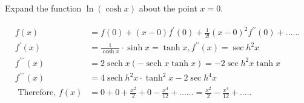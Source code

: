\begin{exercise}
	Expand the function $\ln (\cosh x)$ about the point $x=0$.
\end{exercise}
\begin{answer}
	\begin{align*}
	\begin{aligned}
	f(x)&=f(0)+(x-0) f^{\prime}(0)+\frac{1}{2 !}(x-0)^{2} f^{\prime \prime}(0)+\ldots \ldots \\
	f^{\prime}(x)&=\frac{1}{\cosh x} \cdot \sinh x=\tanh x, f^{\prime \prime}(x)=\sec h^{2} x \\
	f^{\prime \prime \prime}(x)&=2 \operatorname{sech} x(-\operatorname{sech} x \tanh x)=-2 \sec h^{2} x \tanh x \\
	f^{\prime \prime \prime}(x)&=4 \operatorname{sech} h^{2} x \cdot \tanh ^{2} x-2 \sec h^{4} x\\
	\text { Therefore, } f(x)&=0+0+\frac{x^{2}}{2}+0-\frac{x^{4}}{12}+\ldots \ldots=\frac{x^{2}}{2}-\frac{x^{4}}{12}+\ldots . .
	\end{aligned}
	\end{align*}
\end{answer}
